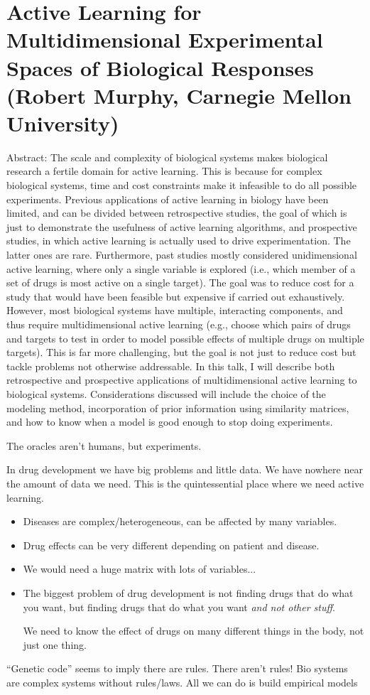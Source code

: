 \section{Active Learning for Multidimensional Experimental Spaces of Biological Responses (Robert Murphy, Carnegie Mellon University)}

Abstract: The scale and complexity of biological systems makes biological research a fertile domain for active learning. This is because for complex biological systems, time and cost constraints make it infeasible to do all possible experiments. Previous applications of active learning in biology have been limited, and can be divided between retrospective studies, the goal of which is just to demonstrate the usefulness of active learning algorithms, and prospective studies, in which active learning is actually used to drive experimentation. The latter ones are rare. Furthermore, past studies mostly considered unidimensional active learning, where only a single variable is explored (i.e., which member of a set of drugs is most active on a single target). The goal was to reduce cost for a study that would have been feasible but expensive if carried out exhaustively. However, most biological systems have multiple, interacting components, and thus require multidimensional active learning (e.g., choose which pairs of drugs and targets to test in order to model possible effects of multiple drugs on multiple targets). This is far more challenging, but the goal is not just to reduce cost but tackle problems not otherwise addressable. In this talk, I will describe both retrospective and prospective applications of multidimensional active learning to biological systems. Considerations discussed will include the choice of the modeling method, incorporation of prior information using similarity matrices, and how to know when a model is good enough to stop doing experiments.

The oracles aren't humans, but experiments.

In drug development we have big problems and little data. We have nowhere near the amount of data we need. This is the quintessential place where we need active learning.
\begin{itemize}
\item
Diseases are complex/heterogeneous, can be affected by many variables.
\item
Drug effects can be very different depending on patient and disease.
\item
We would need a huge matrix with lots of variables...
\item
The biggest problem of drug development is not finding drugs that do what you want, but finding drugs that do what you want \emph{and not other stuff}.

We need to know the effect of drugs on many different things in the body, not just one thing.
\end{itemize}
``Genetic code'' seems to imply there are rules. There aren't rules! Bio systems are complex systems without rules/laws. All we can do is build empirical models

